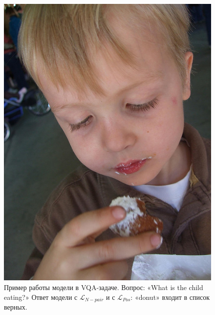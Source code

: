 \documentclass[a4paper, 14pt]{article}
\begin{document}
\begin{figure}[!ht]
    \begin{center}
    \includegraphics[scale = 0.4]{Pictures/contrastive_example.png}
    \caption{Пример работы модели в VQA-задаче. Вопрос: «What is the child eating?» Ответ модели с $\mathcal{L}_{N-pair}$ и с $\mathcal{L}_{Pos}$: «donut» входит в список верных.}
    \label{fg:vqa}
    \end{center}
\end{figure}
\end{document}
